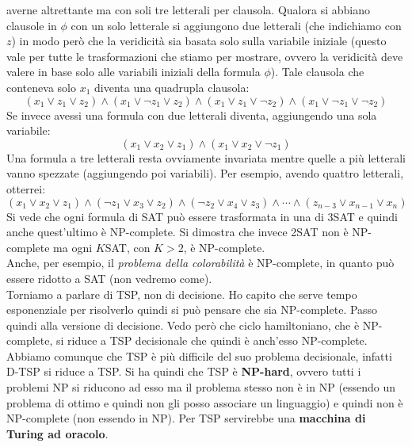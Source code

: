 \documentclass[a4paper,12pt, oneside]{book}
\begin{document}
averne altrettante ma con soli tre letterali per clausola. Qualora si abbiano
clausole in $\phi$ con un solo letterale si aggiungono due letterali (che
indichiamo con $z$) in modo
però che la veridicità sia basata solo sulla variabile iniziale (questo vale per
tutte le trasformazioni che stiamo per mostrare, ovvero la veridicità deve
valere in base solo alle variabili iniziali della formula $\phi$). Tale clausola
che conteneva solo $x_1$ diventa una quadrupla clausola:
\[(x_1\lor z_1\lor z_2)\land (x_1\lor\neg z_1\lor z_2)\land (x_1\lor z_1\lor\neg
  z_2)\land(x_1\lor\neg z_1\lor\neg z_2)\] 
Se invece avessi una formula con due letterali diventa, aggiungendo una sola
variabile: 
\[(x_1\lor x_2\lor z_1)\land (x_1\lor x_2\lor \neg z_1)\]
Una formula a tre letterali resta ovviamente invariata mentre quelle a più
letterali vanno spezzate (aggiungendo poi variabili). Per esempio, avendo
quattro letterali, otterrei:
\[(x_1\lor x_2\lor z_1)\land (\neg z_1\lor x_3\lor z_2)\land (\neg z_2\lor
  x_4\lor z_3)\land\cdots\land(z_{n-3}\lor x_{n-1}\lor x_n)\]
Si vede che ogni formula di SAT può essere trasformata in una di 3SAT e quindi
anche quest'ultimo è NP-complete. Si dimostra che invece 2SAT non è NP-complete
ma ogni $K$SAT, con $K>2$, è NP-complete.\\
Anche, per esempio, il \textit{problema della colorabilità} è NP-complete, in
quanto può essere ridotto a SAT (non vedremo come).\\
Torniamo a parlare di TSP, non di decisione. Ho capito che serve tempo
esponenziale per risolverlo quindi si può pensare che sia NP-complete. Passo
quindi alla versione di decisione. Vedo però che ciclo
hamiltoniano, che è NP-complete, si riduce a TSP decisionale che quindi è
anch'esso NP-complete. Abbiamo comunque che TSP è più difficile del suo problema
decisionale, infatti D-TSP si riduce a TSP. Si ha quindi che TSP è
\textbf{NP-hard}, ovvero tutti i problemi NP si riducono ad esso ma il problema
stesso non è in NP (essendo un problema di ottimo e quindi non gli posso
associare un linguaggio) e quindi non è NP-complete (non essendo in NP). Per
TSP servirebbe una \textbf{macchina di Turing ad oracolo}.
\end{document}
